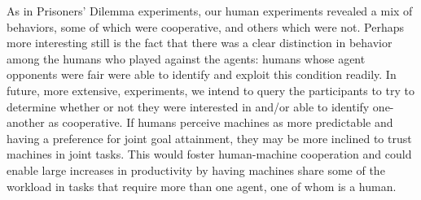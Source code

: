 \documentclass[letterpaper]{article}
\begin{document}
As in Prisoners' Dilemma experiments, our human experiments
revealed a mix of behaviors, some of which were cooperative, and
others which were not.  Perhaps more interesting still is the fact
that there was a clear distinction in behavior among the humans who
played against the agents: humans whose agent opponents were fair were
able to identify and exploit this condition readily.  In future, more
extensive, experiments, we intend to query the participants to try to
determine whether or not they were interested in and/or able to
identify one-another as cooperative.  If humans perceive machines as more predictable and having a preference for joint goal attainment, they may be more inclined to trust machines in joint tasks. This would foster human-machine cooperation and could enable large increases in productivity by having machines share some of the workload in tasks that require more than one agent, one of whom is a human.



\end{document}
